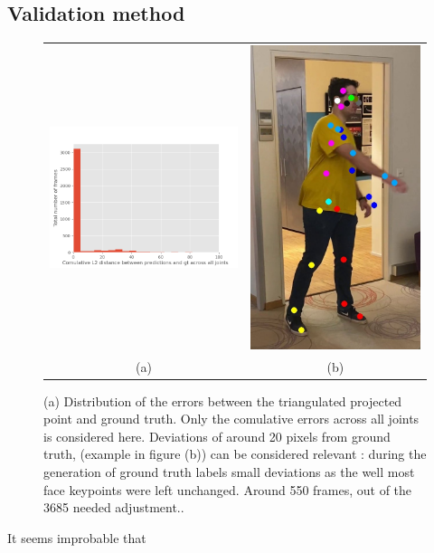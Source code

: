 \subsection{Validation method}

\begin{figure}
  \centering
  \begin{tabular}{@{}cc@{}}
    \includegraphics[height=0.487\linewidth]{figures/hist_diff_to_handlabel.png}&
    \includegraphics[height=0.487\linewidth]{figures/dominik_office_cloth_yellow_phone2_40.jpg}\\
    (a)&(b)\\
    \end{tabular}
  \caption{ 
    \textup{(a)}   Distribution of the errors between the triangulated projected point and ground truth. Only the comulative errors across all joints is considered here. Deviations of around 20 pixels from ground truth, (example in figure  \textup{(b)}) can be considered relevant : during the generation of ground truth labels small deviations as the well most face keypoints were left unchanged. Around 550 frames, out of the 3685 needed adjustment..
    \label{fig:comulative_3D_predictions_errors}
     }
\end{figure}
It seems improbable that  

